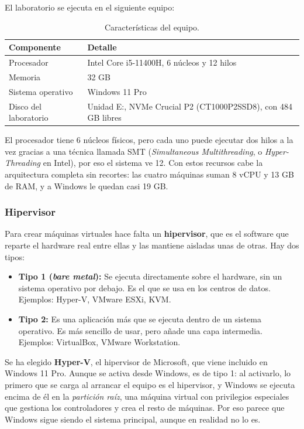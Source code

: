 \documentclass[11pt, a4paper, titlepage]{article}
\begin{document}
El laboratorio se ejecuta en el siguiente equipo:

\begin{table}[H]
\centering
\small
\begin{tabular}{lp{9cm}}
\toprule
\textbf{Componente} & \textbf{Detalle} \\
\midrule
Procesador & Intel Core i5-11400H, 6 núcleos y 12 hilos \\
Memoria & 32 GB \\
Sistema operativo & Windows 11 Pro \\
Disco del laboratorio & Unidad E:, NVMe Crucial P2 (CT1000P2SSD8), con 484 GB libres \\
\bottomrule
\end{tabular}
\caption{Características del equipo.}
\label{tab:equipo}
\end{table}

El procesador tiene 6 núcleos físicos, pero cada uno puede ejecutar dos hilos a la vez gracias a una técnica llamada SMT (\textit{Simultaneous Multithreading}, o \textit{Hyper-Threading} en Intel), por eso el sistema ve 12. Con estos recursos cabe la arquitectura completa sin recortes: las cuatro máquinas suman 8 vCPU y 13 GB de RAM, y a Windows le quedan casi 19 GB.

\subsubsection{Hipervisor}

Para crear máquinas virtuales hace falta un \textbf{hipervisor}, que es el software que reparte el hardware real entre ellas y las mantiene aisladas unas de otras. Hay dos tipos:

\begin{itemize}
    \item \textbf{Tipo 1 (\textit{bare metal}):} Se ejecuta directamente sobre el hardware, sin un sistema operativo por debajo. Es el que se usa en los centros de datos. Ejemplos: Hyper-V, VMware ESXi, KVM.
    \item \textbf{Tipo 2:} Es una aplicación más que se ejecuta dentro de un sistema operativo. Es más sencillo de usar, pero añade una capa intermedia. Ejemplos: VirtualBox, VMware Workstation.
\end{itemize}

Se ha elegido \textbf{Hyper-V}, el hipervisor de Microsoft, que viene incluido en Windows 11 Pro. Aunque se activa desde Windows, es de tipo 1: al activarlo, lo primero que se carga al arrancar el equipo es el hipervisor, y Windows se ejecuta encima de él en la \textit{partición raíz}, una máquina virtual con privilegios especiales que gestiona los controladores y crea el resto de máquinas. Por eso parece que Windows sigue siendo el sistema principal, aunque en realidad no lo es.
\end{document}
